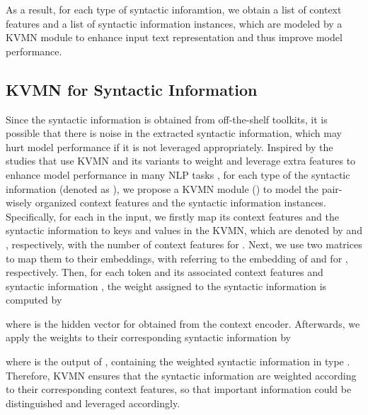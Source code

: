 \documentclass[11pt,a4paper]{article}
\begin{document}
\vspace{0.2cm}


As a result, for each type of syntactic inforamtion, we obtain a list of context features and a list of syntactic information instances, which are modeled by a KVMN module to enhance input text representation and thus improve model performance.





\subsection{KVMN for Syntactic Information}





Since the syntactic information is obtained from off-the-shelf toolkits, it is possible that there is noise in the extracted syntactic information, which may hurt model performance if it is not leveraged appropriately.
Inspired by the studies that use KVMN and its variants to weight and leverage extra features to enhance model performance in many NLP tasks \cite{miller2016key,mino-etal-2017-key,xu-etal-2019-enhancing,tian2020improving}, for
each type of the syntactic information (denoted as ),
we propose a KVMN module () to model the pair-wisely organized context features and the syntactic information instances.
Specifically, for each  in the input, we firstly map its context features and the syntactic information to keys and values in the KVMN, which are denoted by  and , respectively, with  the number of context features for .
Next, we use two matrices to map them to their embeddings, with  referring to the embedding of  and  for , respectively.
Then, for each token  and its associated context features  and syntactic information ,
the weight assigned to the syntactic information  is computed by

where  is the hidden vector for  obtained from the context encoder.
Afterwards, we apply the weights  to their corresponding syntactic information  by

where  is the output of , containing the weighted syntactic information in type .
Therefore, KVMN ensures that the syntactic information are weighted according to their corresponding context features, so that important information could be distinguished and leveraged accordingly.
\end{document}
